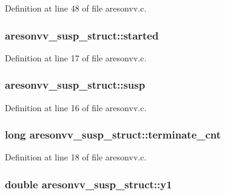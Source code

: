 Definition at line 48 of file aresonvv.\+c.

\subsubsection[{\texorpdfstring{started}{started}}]{ aresonvv\+\_\+susp\+\_\+struct\+::started}\hypertarget{structaresonvv__susp__struct_aafdeffeb4386f88c1624c483fc88dc88}{}\label{structaresonvv__susp__struct_aafdeffeb4386f88c1624c483fc88dc88}


Definition at line 17 of file aresonvv.\+c.

\subsubsection[{\texorpdfstring{susp}{susp}}]{ aresonvv\+\_\+susp\+\_\+struct\+::susp}\hypertarget{structaresonvv__susp__struct_a59ab09afe3bae0a5b998134e2c15576f}{}\label{structaresonvv__susp__struct_a59ab09afe3bae0a5b998134e2c15576f}


Definition at line 16 of file aresonvv.\+c.

\subsubsection[{\texorpdfstring{terminate\+\_\+cnt}{terminate_cnt}}]{\setlength{\rightskip}{0pt plus 5cm}long aresonvv\+\_\+susp\+\_\+struct\+::terminate\+\_\+cnt}\hypertarget{structaresonvv__susp__struct_aa592c64d1525d64122ed1f43f4b3ee32}{}\label{structaresonvv__susp__struct_aa592c64d1525d64122ed1f43f4b3ee32}


Definition at line 18 of file aresonvv.\+c.

\subsubsection[{\texorpdfstring{y1}{y1}}]{\setlength{\rightskip}{0pt plus 5cm}double aresonvv\+\_\+susp\+\_\+struct\+::y1}\hypertarget{structaresonvv__susp__struct_af45322e59548c6fca7534bed1aae279c}{}\label{structaresonvv__susp__struct_af45322e59548c6fca7534bed1aae279c}


